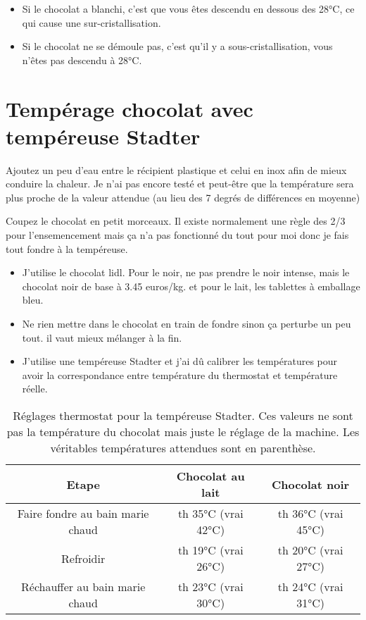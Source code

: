 \documentclass[a4paper,twoside,openright]{report}
\begin{document}
\begin{remarque}
\begin{itemize}
\item Si le chocolat a blanchi, c’est que vous êtes descendu en dessous des 28°C, ce qui cause une sur-cristallisation.
\item Si le chocolat ne se démoule pas, c'est qu'il y a sous-cristallisation, vous n'êtes pas descendu à 28°C.
\end{itemize}
\end{remarque}

\section{Tempérage chocolat avec tempéreuse Stadter}\label{sec:tempereuse}

\begin{attention}
Ajoutez un peu d'eau entre le récipient plastique et celui en inox afin de mieux conduire la chaleur. Je n'ai pas encore testé et peut-être que la température sera plus proche de la valeur attendue (au lieu des 7 degrés de différences en moyenne)
\end{attention}


Coupez le chocolat en petit morceaux. Il existe normalement une règle des 2/3 pour l'ensemencement mais ça n'a pas fonctionné du tout pour moi donc je fais tout fondre à la tempéreuse.
\begin{remarque}
\begin{itemize}
\item J'utilise le chocolat lidl. Pour le noir, ne pas prendre le noir intense, mais le chocolat noir de base à 3.45 euros/kg. et pour le lait, les tablettes à emballage bleu.
\item Ne rien mettre dans le chocolat en train de fondre sinon ça perturbe un peu tout. il vaut mieux mélanger à la fin.
\item J'utilise une tempéreuse Stadter et j'ai dû calibrer les températures pour avoir la correspondance entre température du thermostat et température réelle.
\end{itemize}
\end{remarque}

\begin{table}[hb]
\centering
\begin{tabular}{|c|c|c|}
\hline 
Etape & Chocolat au lait & Chocolat noir \\\hline
Faire fondre au bain marie chaud & th 35°C (vrai 42°C)   & th 36°C (vrai 45°C) \\\hline
Refroidir                        & th 19°C (vrai 26°C)   & th 20°C (vrai 27°C)   \\\hline
Réchauffer au bain marie chaud   & th 23°C (vrai 30°C)   & th 24°C (vrai 31°C)   \\\hline
\end{tabular} 
\caption{Réglages thermostat pour la tempéreuse Stadter. Ces valeurs ne sont pas la température du chocolat mais juste le réglage de la machine. Les véritables températures attendues sont en parenthèse.}
\end{table}
\end{document}
